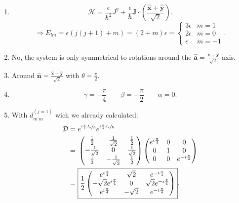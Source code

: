 \documentclass[notitlepage]{report}
\begin{document}
\begin{enumerate}[label=\alph*)]
	\item \[
		\mathcal{H}=\frac{\epsilon}{\hslash^2} J^2 + \frac{\epsilon}{\hslash} \boldsymbol{J} \cdot \left(\frac{\hat{\boldsymbol{x}}+\hat{\boldsymbol{y}}}{\sqrt{2} }\right) 
	.\] 
	\[
		\Rightarrow E_{lm}=\epsilon \left(j\left(j+1\right) + m\right)  =\left(2+m\right)\epsilon =
		\begin{cases}
			3\epsilon & m=1\\
			2\epsilon & m=0\\
			\epsilon & m=-1
		\end{cases}
	.\] 
\item No, the system is only symmetrical to rotations around the $\hat{\boldsymbol{a}}=\frac{\hat{\boldsymbol{x}}+\hat{\boldsymbol{y}}}{\sqrt{2} }$ axis.
\item Around $\hat{\boldsymbol{n}}=\frac{\hat{\boldsymbol{x}}-\hat{\boldsymbol{y}}}{\sqrt{2}}$ with $\theta= \frac{\pi}{2}$.
\item \[
	\gamma= -\frac{\pi}{4}\qquad\beta= -\frac{\pi}{2}\qquad\alpha=0
.\] 
\item With $d_{m^\prime m}^{\left(j=1\right) }$ wich we already calculated:\\
	\begin{align*}
	\mathcal{D} =&\ e^{\sfrac{i \frac{\pi}{2}J_y}{\hslash}}e^{\sfrac{i \frac{\pi}{4}J_z}{\hslash}}\\
	 =&\ 
			\begin{pmatrix}
				\frac{1}{2}& \frac{1}{\sqrt{2}} &\frac{1}{2} \\
				-\frac{1}{\sqrt{2}} & 0 & \frac{1}{\sqrt{2}}\\
				\frac{1}{2} & -\frac{1}{\sqrt{2}} &\frac{1}{2} 
			\end{pmatrix}
			\begin{pmatrix}
				e^{i \frac{\pi}{4}} & 0 & 0\\
				0 & 1 & 0\\
				0 & 0 & e^{-i \frac{\pi}{4}}
			\end{pmatrix}\\
			 =&\ \boxed{\frac{1}{2}
			\begin{pmatrix}
			e^{i \frac{\pi}{4}} & \sqrt{2}  & e^{-i \frac{\pi}{4}}\\
			 -\sqrt{2}e^{i \frac{\pi}{4}}& 0 & \sqrt{2}e^{-i \frac{\pi}{4}}\\
			 e^{i \frac{\pi}{4}}& -\sqrt{2} & e^{-i \frac{\pi}{4}} 
			\end{pmatrix}} 
	.\end{align*}

\end{enumerate}
\end{document}
